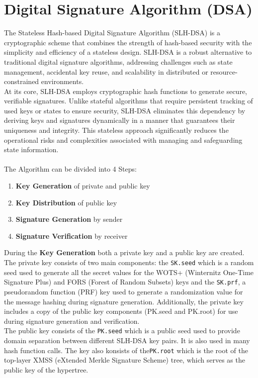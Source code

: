 \documentclass[journal=tosc,notanonymous]{iacrtrans}
\begin{document}
\section{Digital Signature Algorithm (DSA)}
The Stateless Hash-based Digital Signature Algorithm (SLH-DSA) is a cryptographic scheme that combines the strength of hash-based security with the simplicity and efficiency of a stateless design. SLH-DSA is a robust alternative to traditional digital signature algorithms, addressing challenges such as state management, accidental key reuse, and scalability in distributed or resource-constrained environments.
\\
At its core, SLH-DSA employs cryptographic hash functions to generate secure, verifiable signatures. Unlike stateful algorithms that require persistent tracking of used keys or states to ensure security, SLH-DSA eliminates this dependency by deriving keys and signatures dynamically in a manner that guarantees their uniqueness and integrity. This stateless approach significantly reduces the operational risks and complexities associated with managing and safeguarding state information.\\
\\
The Algorithm can be divided into 4 Steps:
\begin{enumerate}
	\item \textbf{Key Generation} of private and public key
	\item \textbf{Key Distribution}  of public key
	\item \textbf{Signature Generation} by sender
	\item \textbf{Signature Verification} by receiver
\end{enumerate}
During the \textbf{Key Generation} both a private key and a public key are created. The private key consists of two main components:
the \texttt{SK.seed} which is a random seed used to generate all the secret values for the WOTS+ (Winternitz One-Time Signature Plus) and FORS (Forest of Random Subsets) keys and the \texttt{SK.prf}, a pseudorandom function (PRF) key used to generate a randomization value for the message hashing during signature generation.
Additionally, the private key includes a copy of the public key components (PK.seed and PK.root) for use during signature generation and verification.
\\
The public key consists of the \texttt{PK.seed} which is a public seed used to provide domain separation between different SLH-DSA key pairs. It is also used in many hash function calls. The key also konsists of the\texttt{PK.root} which is the root of the top-layer XMSS (eXtended Merkle Signature Scheme) tree, which serves as the public key of the hypertree.
\end{document}
